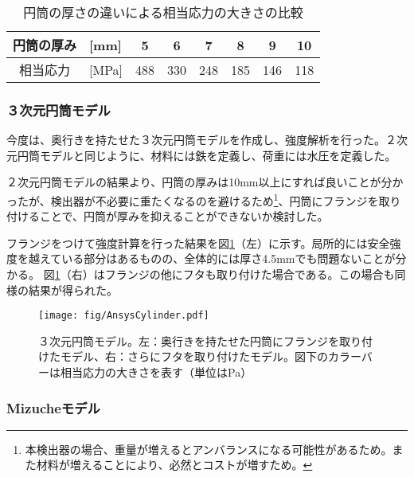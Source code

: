 \documentclass[11pt]{jreport}
\newcommand{\figref}[1]{図\ref{#1}}
\newcommand{\tabref}[1]{表\ref{#1}}
\begin{document}
\begin{table}[htbp]
\caption[円筒の厚さの違いによる相当応力の大きさの比較]{円筒の厚さの違いによる相当応力の大きさの比較}
\begin{center}
\begin{tabular}{clcccccc}
\hline \hline
円筒の厚み & [mm] & 5 & 6 & 7 & 8 & 9 & 10 \\
\hline
相当応力 & [MPa] & 488 & 330 & 248 & 185 & 146 & 118\\
\hline \hline
\end{tabular}
\end{center}
\label{Ansys2DResult}
\end{table}%


\subsubsection{３次元円筒モデル}
今度は、奥行きを持たせた３次元円筒モデルを作成し、強度解析を行った。２次元円筒モデルと同じように、材料には鉄を定義し、荷重には水圧を定義した。

２次元円筒モデルの結果より、円筒の厚みは10mm以上にすれば良いことが分かったが、検出器が不必要に重たくなるのを避けるため\footnote{本検出器の場合、重量が増えるとアンバランスになる可能性があるため。また材料が増えることにより、必然とコストが増すため。}、円筒にフランジを取り付けることで、円筒が厚みを抑えることができないか検討した。

フランジをつけて強度計算を行った結果を\figref{AnsysCylinder}（左）に示す。局所的には安全強度を越えている部分はあるものの、全体的には厚さ4.5mmでも問題ないことが分かる。
\figref{AnsysCylinder}（右）はフランジの他にフタも取り付けた場合である。この場合も同様の結果が得られた。

\begin{figure}[htbp]
\centering
\texttt{[image: fig/AnsysCylinder.pdf]}
\caption[３次元円筒モデル]{３次元円筒モデル。左：奥行きを持たせた円筒にフランジを取り付けたモデル、右：さらにフタを取り付けたモデル。図下のカラーバーは相当応力の大きさを表す（単位はPa）}
\label{AnsysCylinder}
\end{figure}

\subsubsection{Mizucheモデル}
\end{document}
